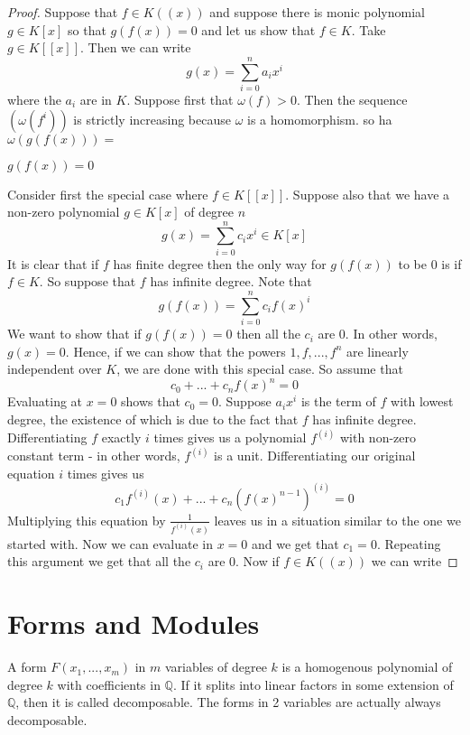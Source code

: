 \documentclass{article}
\newcommand{\mbb}[1]{\mathbb{#1}}
\begin{document}
\begin{proof}
    Suppose that $f \in K((x))$ and suppose there is monic polynomial $g \in K[x]$ so that $g(f(x)) = 0$ and let us show that $f \in K$. Take $g \in K[[x]]$. Then we can write
    $$g(x) = \sum_{i=0}^n a_i x^i$$
    where the $a_i$ are in $K$. 
    Suppose first that $\omega(f) > 0$. Then the sequence $(\omega(f^i))$ is strictly increasing because $\omega$ is a homomorphism. so ha $\omega(g(f(x))) =  $ 
    
    $g(f(x)) = 0$

    Consider first the special case where $f \in K[[x]]$. Suppose also that we have a non-zero polynomial $g \in K[x]$ of degree $n$
    $$g(x) = \sum_{i = 0}^n c_i x^i \in K[x]$$
    It is clear that if $f$ has finite degree then the only way for $g(f(x))$ to be 0 is if $f \in K$. So suppose that $f$ has infinite degree. Note that
    $$g(f(x)) = \sum_{i = 0}^n c_i f(x)^i$$
    We want to show that if $g(f(x)) = 0$ then all the $c_i$ are 0. In other words, $g(x) = 0$. Hence, if we can show that the powers $1, f, ..., f^{n}$ are linearly independent over $K$, we are done with this special case. So assume that 
    $$c_0  + ... + c_n f(x)^n = 0$$
    Evaluating at $x = 0$ shows that $c_0 = 0$. Suppose $a_i x^i$ is the term of $f$ with lowest degree, the existence of which is due to the fact that $f$ has infinite degree. Differentiating $f$ exactly $i$ times gives us a polynomial $f^{(i)}$ with non-zero constant term - in other words, $f^{(i)}$ is a unit. Differentiating our original equation $i$ times gives us 
    $$c_1 f^{(i)}(x) + ... + c_n (f(x)^{n-1})^{(i)} = 0$$
    Multiplying this equation by $\frac{1}{f^{(i)}(x)}$ leaves us in a situation similar to the one we started with. Now we can evaluate in $x = 0$ and we get that $c_1 = 0$. Repeating this argument we get that all the $c_i$ are 0. Now if $f \in K((x))$ we can write 
\end{proof}








\section{Forms and Modules}
A form $F(x_1, ..., x_m)$ in $m$ variables of degree $k$ is a homogenous polynomial of degree $k$ with coefficients in $\mbb{Q}$. If it splits into linear factors in some extension of $\mbb{Q}$, then it is called decomposable. The forms in 2 variables are actually always decomposable. 
\end{document}
